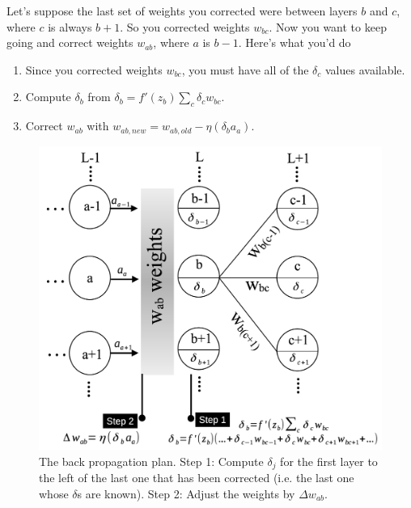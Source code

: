 \documentclass[12pt]{article}
\begin{document}
Let's suppose the last set of weights you corrected were between layers $b$ and $c$, where $c$ is always $b+1$.  So you corrected weights $w_{bc}$. Now you want to keep going and correct weights $w_{ab}$, where $a$ is $b-1$. Here's what you'd do

\begin{enumerate}

\item Since you corrected weights $w_{bc}$, you must have all of the $\delta_c$ values available.

\item Compute $\delta_b$ from $\delta_b=f'(z_b)\sum_c\delta_c w_{bc}$.	

\item Correct $w_{ab}$ with $w_{ab,new}=w_{ab,old}-\eta(\delta_b a_a)$.

\end{enumerate}

\begin{figure}[h]
\begin{center}
\includegraphics[scale=0.3]{Figs/wxy_change.png}
\caption{The back propagation plan. Step 1: Compute $\delta_j$ for the first layer to the left of the last one that has been corrected (i.e. the last one whose $\delta$s are known). Step 2: Adjust the weights by $\Delta w_{ab}$.}
\label{wxy_change}
\end{center}
\end{figure}
\end{document}
